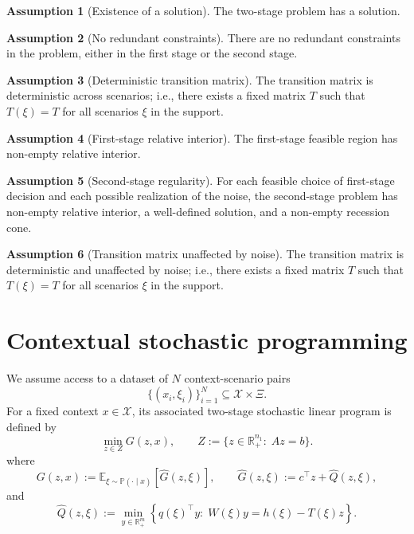 \documentclass{article}
\newcommand{\R}{\mathbb{R}}
\newcommand{\E}{\mathbb{E}}
\theoremstyle{plain}
\theoremstyle{definition}
\newtheorem{assumption}{Assumption}
\theoremstyle{remark}
\begin{document}
\begin{assumption}[Existence of a solution]
\label{ass:solution-exists}
The two-stage problem has a solution.
\end{assumption}

\begin{assumption}[No redundant constraints]
\label{ass:no-redundant-constraints}
There are no redundant constraints in the problem, either in the first stage or the second stage.
\end{assumption}

\begin{assumption}[Deterministic transition matrix]
\label{ass:T-deterministic}
The transition matrix is deterministic across scenarios; i.e., there exists a fixed matrix $T$ such that $T(\xi)=T$ for all scenarios $\xi$ in the support.
\end{assumption}

\begin{assumption}[First-stage relative interior]
\label{ass:first-stage-ri}
The first-stage feasible region has non-empty relative interior.
\end{assumption}

\begin{assumption}[Second-stage regularity]
\label{ass:second-stage-regularity}
For each feasible choice of first-stage decision and each possible realization of the noise, the second-stage problem has non-empty relative interior, a well-defined solution, and a non-empty recession cone.
\end{assumption}

\begin{assumption}[Transition matrix unaffected by noise]
\label{ass:T-noise-unaffected}
The transition matrix is deterministic and unaffected by noise; i.e., there exists a fixed matrix $T$ such that $T(\xi)=T$ for all scenarios $\xi$ in the support.
\end{assumption}

\section{Contextual stochastic programming}
\label{sec:contextual-stochastic}

We assume access to a dataset of $N$ context-scenario pairs
\[
\{(x_i,\xi_i)\}_{i=1}^N \subseteq \mathcal X \times \Xi.
\]
For a fixed context $x\in\mathcal X$, its associated two-stage stochastic linear program is defined by
\begin{equation}
\label{eq:contextual-program}
\min_{z\in Z} G(z,x),
\qquad
Z:=\{z\in\R^{n_1}_+:\;Az=b\}.
\end{equation}
where
\begin{equation}
\label{eq:contextual-G}
G(z,x):=\E_{\xi\sim\mathbb P(\cdot\mid x)}\!\left[\hat G(z,\xi)\right],
\qquad
\hat G(z,\xi):=c^\top z+\hat Q(z,\xi),
\end{equation}
and
\begin{equation}
\label{eq:contextual-hatQ}
\hat Q(z,\xi):=\min_{y\in\R^{m}_+}\left\{q(\xi)^\top y:\;W(\xi)y=h(\xi)-T(\xi)z\right\}.
\end{equation}
\end{document}

